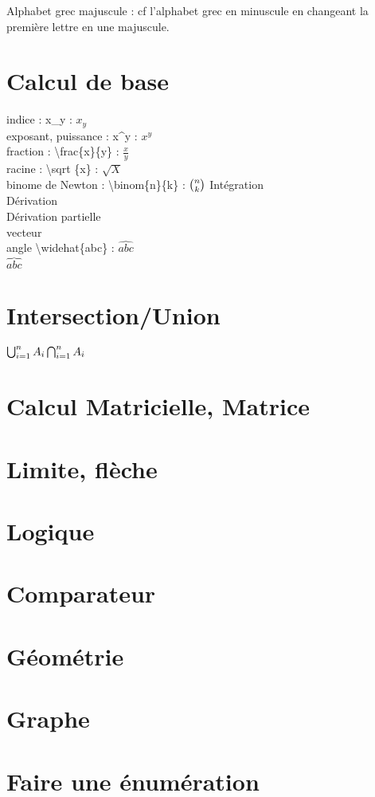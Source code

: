 \documentclass{article}
\begin{document}
Alphabet grec majuscule  : cf l'alphabet grec en minuscule en changeant la première lettre en une majuscule.
\section{Calcul de base}

indice : x\_y : $x_y$\\
exposant, puissance : x\^{ }y : $x^y$\\
fraction : \textbackslash frac\{x\}\{y\} : $\frac{x}{y}$\\
racine : \textbackslash sqrt \{x\} : $\sqrt{X}$\\
binome de Newton : \textbackslash binom\{n\}\{k\} : $\binom{n}{k}\\
$
Intégration\\
Dérivation\\
Dérivation partielle\\
vecteur\\
angle \textbackslash widehat\{abc\} : $\widehat{abc}$\\
$\overbrace{abc}$

\section{Intersection/Union}
$
\bigcup_{i=1}^n A_i\\
\bigcap_{i=1}^n A_i$
\section{Calcul Matricielle, Matrice}


\section{Limite, flèche}

\section{Logique}

\section{Comparateur}

\section{Géométrie}

\section{Graphe}

\section{Faire une énumération}
\end{document}
